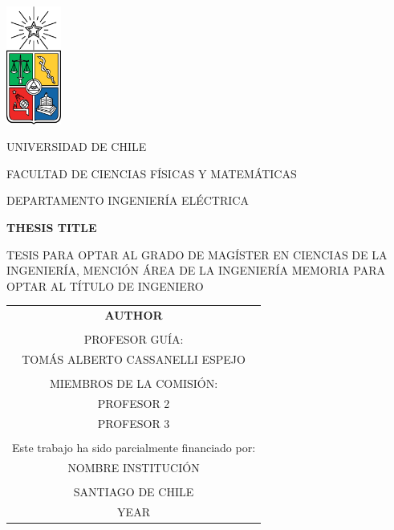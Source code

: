 \documentclass[
	12pt,
	letterpaper,
  oneside
  ]{book}
\begin{document}
  \thispagestyle{empty}
	\def\arraystretch{1.15}

  
  \begin{minipage}[t]{0.125\linewidth}
    \includegraphics[width=1.8cm]{uchile}
  \end{minipage}
	\begin{minipage}[b]{0.8\linewidth}
		\MakeUppercase{Universidad de Chile}

		\MakeUppercase{Facultad de Ciencias Físicas y Matemáticas}

		\MakeUppercase{Departamento Ingeniería Eléctrica}
	\end{minipage}

	\begin{center}
    \vspace{1.5cm}

    \MakeUppercase{\textbf{Thesis Title}}

    \vspace{1.5cm}

    \MakeUppercase{Tesis para optar al grado de magíster en ciencias de la ingeniería, mención área de la ingeniería}
	  \bigbreak\vspace{0.3cm}
    \MakeUppercase{Memoria para optar al título de ingeniero}
	
    \vfill

    \begin{tabular}{c}
      \MakeUppercase{\textbf{Author}} \\
      \vspace{1.0cm} \\
      PROFESOR GUÍA: \\
      TOMÁS ALBERTO CASSANELLI ESPEJO \\
      \vspace{0.5cm} \\
      MIEMBROS DE LA COMISIÓN: \\
      PROFESOR 2 \\
      PROFESOR 3 \\
      \vspace{0.5cm} \\
      Este trabajo ha sido parcialmente financiado por: \\
      NOMBRE INSTITUCIÓN \\
      \vspace{0.5cm} \\
      \MakeUppercase{Santiago de Chile} \\
      \MakeUppercase{year}
    \end{tabular}

	\end{center}
\end{document}
